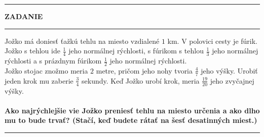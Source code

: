 \documentclass{article}
\begin{document}
\hrule
\medskip
\begin{center}
\textbf{\huge ZADANIE}
\end{center}
\medskip
\hrule
\medskip
\large
Jožko má doniesť ťažkú tehlu na miesto vzdialené $1$ km. 
V polovici cesty je fúrik.
Jožko s tehlou ide $\frac{1}{4}$ jeho normálnej rýchlosti, s fúrikom s tehlou $\frac{1}{3}$ jeho normálnej rýchlosti a s prázdnym fúrikom $\frac{1}{2}$ jeho normálnej rýchlosti.\\
Jožko stojac znožmo meria $2$ metre, pričom jeho nohy tvoria $\frac{4}{7}$ jeho výšky.
Urobiť jeden krok mu zaberie $\frac{3}{4}$ sekundy.
Keď Jožko urobí krok, meria $\frac{19}{20}$ jeho zvyčajnej výšky.\\
\medskip
\\
\textbf{Ako najrýchlejšie vie Jožko preniesť tehlu na miesto určenia a ako dlho mu to bude trvať? (Stačí, keď budete rátať na šesť desatinných miest.)}
\medskip
\hrule
\end{document}
